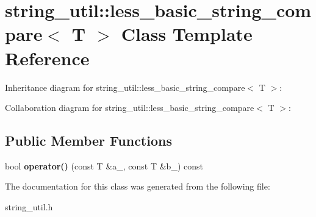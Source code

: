 \section{string\+\_\+util\+:\+:less\+\_\+basic\+\_\+string\+\_\+compare$<$ T $>$ Class Template Reference}
\label{classstring__util_1_1less__basic__string__compare}


Inheritance diagram for string\+\_\+util\+:\+:less\+\_\+basic\+\_\+string\+\_\+compare$<$ T $>$\+:


Collaboration diagram for string\+\_\+util\+:\+:less\+\_\+basic\+\_\+string\+\_\+compare$<$ T $>$\+:
\subsection*{Public Member Functions}
\begin{DoxyCompactItemize}
\item 
bool {\bfseries operator()} (const T \&a\+\_\+, const T \&b\+\_\+) const \label{classstring__util_1_1less__basic__string__compare_a259341e58f36d8aaf75f2415de0df4d8}

\end{DoxyCompactItemize}


The documentation for this class was generated from the following file\+:\begin{DoxyCompactItemize}
\item 
string\+\_\+util.\+h\end{DoxyCompactItemize}
